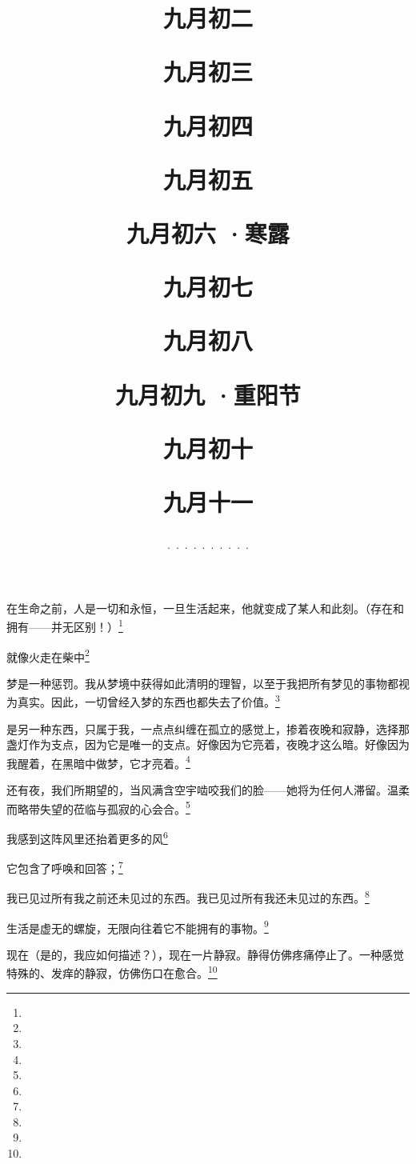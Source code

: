 \title{\date[d=4,m=10,y=2024][year:cn-y,年,month:cn,day:cn,日,·,weekday]·九月初二 }
在生命之前，人是一切和永恒，一旦生活起来，他就变成了某人和此刻。（存在和拥有——并无区别！）\footnote{ }

\title{\date[d=5,m=10,y=2024][year:cn-y,年,month:cn,day:cn,日,·,weekday]·九月初三 }
就像火走在柴中\footnote{ }

\title{\date[d=6,m=10,y=2024][year:cn-y,年,month:cn,day:cn,日,·,weekday]·九月初四 }
梦是一种惩罚。我从梦境中获得如此清明的理智，以至于我把所有梦见的事物都视为真实。因此，一切曾经入梦的东西也都失去了价值。\footnote{ }

\title{\date[d=7,m=10,y=2024][year:cn-y,年,month:cn,day:cn,日,·,weekday]·九月初五 }
是另一种东西，只属于我，一点点纠缠在孤立的感觉上，掺着夜晚和寂静，选择那盏灯作为支点，因为它是唯一的支点。好像因为它亮着，夜晚才这么暗。好像因为我醒着，在黑暗中做梦，它才亮着。\footnote{ }

\title{\date[d=8,m=10,y=2024][year:cn-y,年,month:cn,day:cn,日,·,weekday]·九月初六 ·寒露}
还有夜，我们所期望的，当风满含空宇啮咬我们的脸——她将为任何人滞留。温柔而略带失望的莅临与孤寂的心会合。\footnote{ }

\title{\date[d=9,m=10,y=2024][year:cn-y,年,month:cn,day:cn,日,·,weekday]·九月初七 }
我感到这阵风里还抬着更多的风\footnote{ }

\title{\date[d=10,m=10,y=2024][year:cn-y,年,month:cn,day:cn,日,·,weekday]·九月初八 }
它包含了呼唤和回答；\footnote{ }

\title{\date[d=11,m=10,y=2024][year:cn-y,年,month:cn,day:cn,日,·,weekday]·九月初九 ·重阳节}
我已见过所有我之前还未见过的东西。我已见过所有我还未见过的东西。\footnote{ }

\title{\date[d=12,m=10,y=2024][year:cn-y,年,month:cn,day:cn,日,·,weekday]·九月初十 }
生活是虚无的螺旋，无限向往着它不能拥有的事物。\footnote{ }

\title{\date[d=13,m=10,y=2024][year:cn-y,年,month:cn,day:cn,日,·,weekday]·九月十一 }
现在（是的，我应如何描述？），现在一片静寂。静得仿佛疼痛停止了。一种感觉特殊的、发痒的静寂，仿佛伤口在愈合。\footnote{ }

